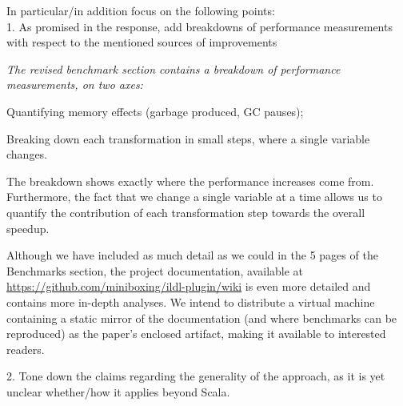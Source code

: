 \documentclass[9pt]{article}
\newenvironment{packed_item}{
\begin{itemize}
  \setlength{\itemsep}{1pt}
  \setlength{\parskip}{0.2pt}
  \setlength{\parsep}{0.2pt}
}{
  \end{itemize}
}
\newenvironment{editorial-addr}
{ \color{OliveGreen} \framebox{{\bf REVISION}} }
{  }
\newenvironment{answer}
{ \em \framebox{{\bf AUTHOR RESPONSE}} }
{  }
\begin{document}
\vspace{5mm}

\begin{editorial-addr}
In particular/in addition focus on the following points: \\
1. As promised in the response, add breakdowns of performance measurements with respect to the mentioned sources of improvements
\end{editorial-addr}

\begin{answer}
The revised benchmark section contains a breakdown of performance measurements, on two axes:
\begin{packed_item}
  \item Quantifying memory effects (garbage produced, GC pauses);
  \item Breaking down each transformation in small steps, where a single variable changes.
\end{packed_item}
The breakdown shows exactly where the performance increases come from. Furthermore, the fact that we change a single variable at a time allows us to quantify the contribution of each transformation step towards the overall speedup.

Although we have included as much detail as we could in the 5 pages of the Benchmarks section, the project documentation, available at \url{https://github.com/miniboxing/ildl-plugin/wiki} is even more detailed and contains more in-depth analyses. We intend to distribute a virtual machine containing a static mirror of the documentation (and where benchmarks can be reproduced) as the paper's enclosed artifact, making it available to interested readers.
\end{answer}

\vspace{5mm}

\begin{editorial-addr}
2. Tone down the claims regarding the generality of the approach, as it is yet unclear whether/how it applies beyond Scala.
\end{editorial-addr}
\end{document}
